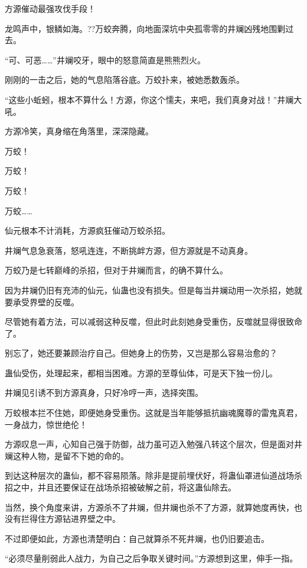 
\begin{this_body}



方源催动最强攻伐手段！

龙鸣声中，银鳞如海。??万蛟奔腾，向地面深坑中央孤零零的井斓凶残地围剿过去。

“可、可恶……”井斓咬牙，眼中的怒意简直是熊熊烈火。

刚刚的一击之后，她的气息陷落谷底。万蛟扑来，被她悉数轰杀。

“这些小蚯蚓，根本不算什么！方源，你这个懦夫，来吧，我们真身对战！”井斓大吼。

方源冷笑，真身缩在角落里，深深隐藏。

万蛟！

万蛟！

万蛟！

万蛟……

仙元根本不计消耗，方源疯狂催动万蛟杀招。

井斓气息急衰落，怒吼连连，不断挑衅方源，但方源就是不动真身。

万蛟乃是七转巅峰的杀招，但对于井斓而言，的确不算什么。

因为井斓仍旧有充沛的仙元，仙蛊也没有损失。但是每当井斓动用一次杀招，她就要承受界壁的反噬。

尽管她有着方法，可以减弱这种反噬，但此时此刻她身受重伤，反噬就显得很致命了。

别忘了，她还要兼顾治疗自己。但她身上的伤势，又岂是那么容易治愈的？

蛊仙受伤，处理起来，都相当困难。方源的至尊仙体，可是天下独一份儿。

井斓见引诱不到方源真身，只好冷哼一声，选择突围。

万蛟根本拦不住她，即便她身受重伤。这就是当年能够抵抗幽魂魔尊的雷鬼真君，一身战力，惊世绝伦！

方源叹息一声，心知自己强于防御，战力虽可迈入勉强八转这个层次，但是面对井斓这种人物，是留不下她的命的。

到达这种层次的蛊仙，都不容易陨落。除非是提前埋伏好，将蛊仙罩进仙道战场杀招之中，并且还要保证在战场杀招被破解之前，将这蛊仙除去。

当然，换个角度来讲，方源杀不了井斓，但井斓也杀不了方源，就算她度再快，也没有拦得住方源钻进界壁之中。

不过即便如此，方源也清楚明白：自己就算杀不死井斓，也仍旧要追击。

“必须尽量削弱此人战力，为自己之后争取关键时间。”方源想到这里，伸手一指。


\end{this_body}
